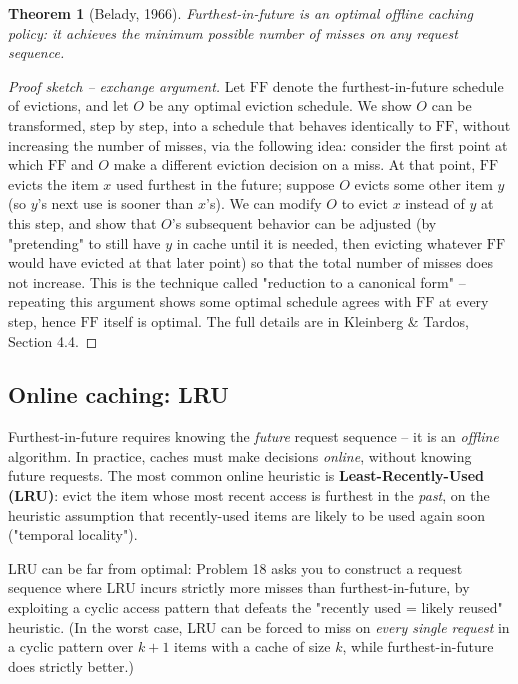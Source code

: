 \documentclass[11pt]{article}
\newtheorem{theorem}{Theorem}[section]
\begin{document}
\begin{theorem}[Belady, 1966]
Furthest-in-future is an optimal offline caching policy: it achieves the minimum possible
number of misses on any request sequence.
\end{theorem}

\begin{proof}[Proof sketch -- exchange argument]
Let $\mathrm{FF}$ denote the furthest-in-future schedule of evictions, and let $O$ be any
optimal eviction schedule. We show $O$ can be transformed, step by step, into a schedule
that behaves identically to $\mathrm{FF}$, without increasing the number of misses, via
the following idea: consider the first point at which $\mathrm{FF}$ and $O$ make a
different eviction decision on a miss. At that point, $\mathrm{FF}$ evicts the item $x$
used furthest in the future; suppose $O$ evicts some other item $y$ (so $y$'s next use is
sooner than $x$'s). We can modify $O$ to evict $x$ instead of $y$ at this step, and show
that $O$'s subsequent behavior can be adjusted (by "pretending" to still have $y$ in cache
until it is needed, then evicting whatever $\mathrm{FF}$ would have evicted at that later
point) so that the total number of misses does not increase. This is the technique called
"reduction to a canonical form" -- repeating this argument shows some optimal schedule
agrees with $\mathrm{FF}$ at every step, hence $\mathrm{FF}$ itself is optimal. The full
details are in Kleinberg \& Tardos, Section 4.4.
\end{proof}

\subsection{Online caching: LRU}

Furthest-in-future requires knowing the \emph{future} request sequence -- it is an
\emph{offline} algorithm. In practice, caches must make decisions \emph{online}, without
knowing future requests. The most common online heuristic is \textbf{Least-Recently-Used
(LRU)}: evict the item whose most recent access is furthest in the \emph{past}, on the
heuristic assumption that recently-used items are likely to be used again soon
("temporal locality").

LRU can be far from optimal: Problem 18 asks you to construct a request sequence where LRU
incurs strictly more misses than furthest-in-future, by exploiting a cyclic access pattern
that defeats the "recently used = likely reused" heuristic. (In the worst case, LRU can be
forced to miss on \emph{every single request} in a cyclic pattern over $k+1$ items with a
cache of size $k$, while furthest-in-future does strictly better.)
\end{document}
